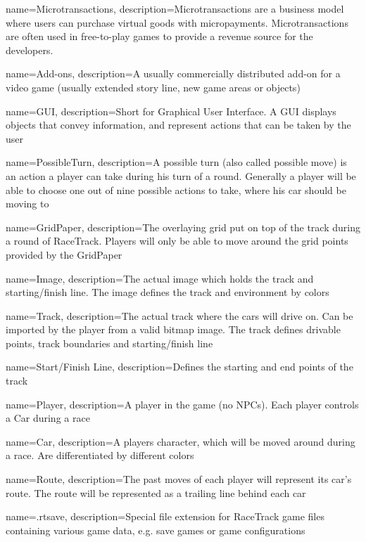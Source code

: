 {
    name=Microtransactions,
    description={Microtransactions are a business model where users can purchase virtual goods with micropayments. Microtransactions are often used in free-to-play games to provide a revenue source for the developers.}
}

{
    name=Add-ons,
    description={A usually commercially distributed add-on for a video game (usually extended story line, new game areas or objects)}
}

{
    name=GUI,
    description={Short for Graphical User Interface. A GUI displays objects that convey information, and represent actions that can be taken by the user}
}

{
    name=PossibleTurn,
    description={A possible turn (also called possible move) is an action a player can take during his turn of a round. Generally a player will be able to choose one out of nine possible actions to take, where his car should be moving to}
}

{
    name=GridPaper,
    description={The overlaying grid put on top of the track during a round of RaceTrack. Players will only be able to move around the grid points provided by the GridPaper}
}

{
    name=Image,
    description={The actual image which holds the track and starting/finish line. The image defines the track and environment by colors}
}

{
    name=Track,
    description={The actual track where the cars will drive on. Can be imported by the player from a valid bitmap image. The track defines drivable points, track boundaries and starting/finish line}
}

{
    name=Start/Finish Line,
    description={Defines the starting and end points of the track}
}

{
    name=Player,
    description={A player in the game (no NPCs). Each player controls a Car during a race}
}

{
    name=Car,
    description={A players character, which will be moved around during a race. Are differentiated by different colors}
}

{
    name=Route,
    description={The past moves of each player will represent its car's route. The route will be represented as a trailing line behind each car}
}

{
    name=.rtsave,
    description={Special file extension for RaceTrack game files containing various game data, e.g. save games or game configurations}
}